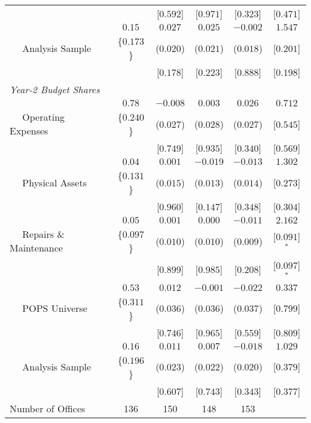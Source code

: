 \begin{longtable}{lccccc}
 & & [$    0.592$]  & [$    0.971$]  & [$    0.323$]  & [$    0.471$]  \\ [0.5em] 
 & $     0.15$ & $    0.027$ & $    0.025$ & $   -0.002$ & $    1.547$ \\ 
 $\quad$ Analysis Sample  & \{$    0.173$\}  & ($    0.020$)  & ($    0.021$)  & ($    0.018$)  & [$    0.201$]  \\ 
 & & [$    0.178$]  & [$    0.223$]  & [$    0.888$]  & [$    0.198$]  \\ [0.5em] 
 \multicolumn{6}{l}{\textit{Year-2 Budget Shares}} \\ 
 & $     0.78$ & $   -0.008$ & $    0.003$ & $    0.026$ & $    0.712$ \\ 
 $\quad$ Operating Expenses  & \{$    0.240$\}  & ($    0.027$)  & ($    0.028$)  & ($    0.027$)  & [$    0.545$]  \\ 
 & & [$    0.749$]  & [$    0.935$]  & [$    0.340$]  & [$    0.569$]  \\ [0.5em] 
 & $     0.04$ & $    0.001$ & $   -0.019$ & $   -0.013$ & $    1.302$ \\ 
 $\quad$ Physical Assets  & \{$    0.131$\}  & ($    0.015$)  & ($    0.013$)  & ($    0.014$)  & [$    0.273$]  \\ 
 & & [$    0.960$]  & [$    0.147$]  & [$    0.348$]  & [$    0.304$]  \\ [0.5em] 
 & $     0.05$ & $    0.001$ & $    0.000$ & $   -0.011$ & $    2.162$ \\ 
 $\quad$ Repairs \& Maintenance  & \{$    0.097$\}  & ($    0.010$)  & ($    0.010$)  & ($    0.009$)  & [$    0.091$]$^{*}$ \\ 
 & & [$    0.899$]  & [$    0.985$]  & [$    0.208$]  & [$    0.097$]$^{*}$ \\ [0.5em] 
 & $     0.53$ & $    0.012$ & $   -0.001$ & $   -0.022$ & $    0.337$ \\ 
 $\quad$ POPS Universe  & \{$    0.311$\}  & ($    0.036$)  & ($    0.036$)  & ($    0.037$)  & [$    0.799$]  \\ 
 & & [$    0.746$]  & [$    0.965$]  & [$    0.559$]  & [$    0.809$]  \\ [0.5em] 
 & $     0.16$ & $    0.011$ & $    0.007$ & $   -0.018$ & $    1.029$ \\ 
 $\quad$ Analysis Sample  & \{$    0.196$\}  & ($    0.023$)  & ($    0.022$)  & ($    0.020$)  & [$    0.379$]  \\ 
 & & [$    0.607$]  & [$    0.743$]  & [$    0.343$]  & [$    0.377$]  \\ [0.5em] 
 \midrule 
 Number of Offices  &     136 &     150 &     148 &     153 & \\ 
 \end{longtable}
